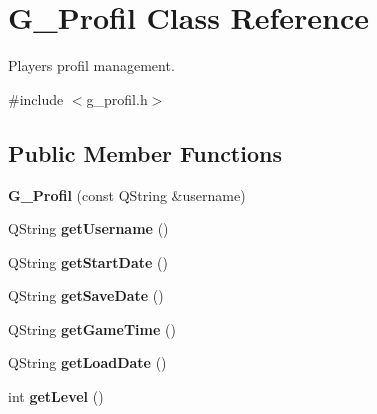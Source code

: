 \hypertarget{class_g___profil}{}\section{G\+\_\+\+Profil Class Reference}
\label{class_g___profil}


Player\textquotesingle{}s profil management.  




{\ttfamily \#include $<$g\+\_\+profil.\+h$>$}

\subsection*{Public Member Functions}
\begin{DoxyCompactItemize}
\item 
\hypertarget{class_g___profil_a8e70c5c39cc069ceb2accc2b67851b06}{}{\bfseries G\+\_\+\+Profil} (const Q\+String \&username)\label{class_g___profil_a8e70c5c39cc069ceb2accc2b67851b06}

\item 
\hypertarget{class_g___profil_ab8ffdb3c23a4021b2263af6f13a7bb1b}{}Q\+String {\bfseries get\+Username} ()\label{class_g___profil_ab8ffdb3c23a4021b2263af6f13a7bb1b}

\item 
\hypertarget{class_g___profil_ae97e1988dc62a9c734a0125b3c569d53}{}Q\+String {\bfseries get\+Start\+Date} ()\label{class_g___profil_ae97e1988dc62a9c734a0125b3c569d53}

\item 
\hypertarget{class_g___profil_a52a7d06bd05574cb898eeb0d7fe89f47}{}Q\+String {\bfseries get\+Save\+Date} ()\label{class_g___profil_a52a7d06bd05574cb898eeb0d7fe89f47}

\item 
\hypertarget{class_g___profil_ad4923c7a22c2b654ae9ac6bbf90a3a1f}{}Q\+String {\bfseries get\+Game\+Time} ()\label{class_g___profil_ad4923c7a22c2b654ae9ac6bbf90a3a1f}

\item 
\hypertarget{class_g___profil_a0621d82cf3b983c5dc0e73931d24f84f}{}Q\+String {\bfseries get\+Load\+Date} ()\label{class_g___profil_a0621d82cf3b983c5dc0e73931d24f84f}

\item 
\hypertarget{class_g___profil_a131ab813ae7e9de05f2bc37d4e30fcd1}{}int {\bfseries get\+Level} ()\label{class_g___profil_a131ab813ae7e9de05f2bc37d4e30fcd1}


\end{DoxyCompactItemize}
